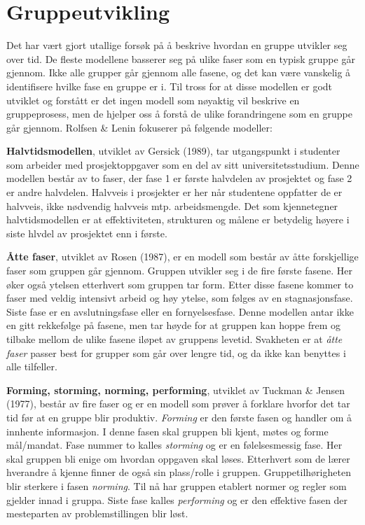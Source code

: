 \section{Gruppeutvikling}
Det har vært gjort utallige forsøk på å beskrive hvordan en gruppe utvikler seg over tid. 
De fleste modellene basserer seg på ulike faser som en typisk gruppe går gjennom. 
Ikke alle grupper går gjennom alle fasene, og det kan være vanskelig å identifisere hvilke fase en gruppe er i.
Til tross for at disse modellen er godt utviklet og forstått er det ingen modell som nøyaktig vil beskrive en gruppeprosess, men de hjelper oss å forstå de ulike forandringene som en gruppe går gjennom. 
Rolfsen \& Lenin fokuserer på følgende modeller:
\vspace{\secspace}

\textbf{Halvtidsmodellen}, utviklet av Gersick (1989), tar utgangspunkt i studenter som arbeider med prosjektoppgaver som en del av sitt universitetsstudium.
Denne modellen består av to faser, der fase 1 er første halvdelen av prosjektet og fase 2 er andre halvdelen. 
Halvveis i prosjekter er her når studentene oppfatter de er halvveis, ikke nødvendig halvveis mtp. arbeidsmengde. 
Det som kjennetegner halvtidsmodellen er at effektiviteten, strukturen og målene er betydelig høyere i siste hlvdel av prosjektet enn i første. 
\vspace{\secspace}

\textbf{Åtte faser}, utviklet av Rosen (1987), er en modell som består av åtte forskjellige faser som gruppen går gjennom.
Gruppen utvikler seg i de fire første fasene. Her øker også ytelsen etterhvert som gruppen tar form.
Etter disse fasene kommer to faser med veldig intensivt arbeid og høy ytelse, som følges av en stagnasjonsfase. 
Siste fase er en avslutningsfase eller en fornyelsesfase.
Denne modellen antar ikke en gitt rekkefølge på fasene, men tar høyde for at gruppen kan hoppe frem og tilbake mellom de ulike fasene iløpet av gruppens levetid. 
Svakheten er at \textit{åtte faser} passer best for grupper som går over lengre tid, og da ikke kan benyttes i alle tilfeller. 
\vspace{\secspace}

\textbf{Forming, storming, norming, performing}, utviklet av Tuckman \& Jensen (1977), består av fire faser og er en modell som prøver å forklare hvorfor det tar tid før at en gruppe blir produktiv.
\textit{Forming} er den første fasen og handler om å innhente informasjon. 
I denne fasen skal gruppen bli kjent, møtes og forme mål/mandat.
Fase nummer to kalles \textit{storming} og er en følelsesmessig fase. 
Her skal gruppen bli enige om hvordan oppgaven skal løses. 
Etterhvert som de lærer hverandre å kjenne finner de også sin plass/rolle i gruppen. 
Gruppetilhørigheten blir sterkere i fasen \textit{norming}. 
Til nå har gruppen etablert normer og regler som gjelder innad i gruppa. 
Siste fase kalles \textit{performing} og er den effektive fasen der mesteparten av problemstillingen blir løst. 